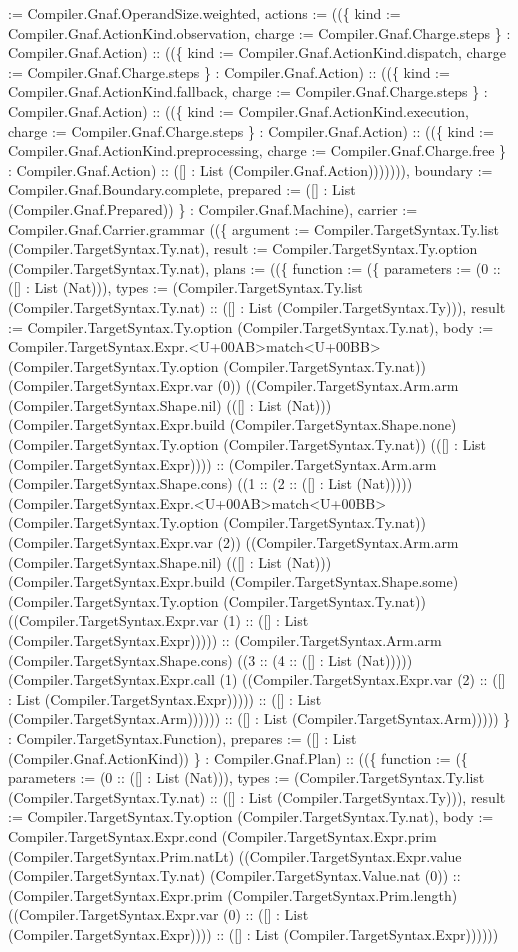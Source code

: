 \documentclass[11pt]{article}
\begin{document}
:= Compiler.Gnaf.OperandSize.weighted, actions := ((\{ kind := Compiler.Gnaf.ActionKind.observation, charge := Compiler.Gnaf.Charge.steps \} : Compiler.Gnaf.Action) :: ((\{ kind := Compiler.Gnaf.ActionKind.dispatch, charge := Compiler.Gnaf.Charge.steps \} : Compiler.Gnaf.Action) :: ((\{ kind := Compiler.Gnaf.ActionKind.fallback, charge := Compiler.Gnaf.Charge.steps \} : Compiler.Gnaf.Action) :: ((\{ kind := Compiler.Gnaf.ActionKind.execution, charge := Compiler.Gnaf.Charge.steps \} : Compiler.Gnaf.Action) :: ((\{ kind := Compiler.Gnaf.ActionKind.preprocessing, charge := Compiler.Gnaf.Charge.free \} : Compiler.Gnaf.Action) :: ([] : List (Compiler.Gnaf.Action))))))), boundary := Compiler.Gnaf.Boundary.complete, prepared := ([] : List (Compiler.Gnaf.Prepared)) \} : Compiler.Gnaf.Machine), carrier := Compiler.Gnaf.Carrier.grammar ((\{ argument := Compiler.TargetSyntax.Ty.list (Compiler.TargetSyntax.Ty.nat), result := Compiler.TargetSyntax.Ty.option (Compiler.TargetSyntax.Ty.nat), plans := ((\{ function := (\{ parameters := (0 :: ([] : List (Nat))), types := (Compiler.TargetSyntax.Ty.list (Compiler.TargetSyntax.Ty.nat) :: ([] : List (Compiler.TargetSyntax.Ty))), result := Compiler.TargetSyntax.Ty.option (Compiler.TargetSyntax.Ty.nat), body := Compiler.TargetSyntax.Expr.<U+00AB>match<U+00BB> (Compiler.TargetSyntax.Ty.option (Compiler.TargetSyntax.Ty.nat)) (Compiler.TargetSyntax.Expr.var (0)) ((Compiler.TargetSyntax.Arm.arm (Compiler.TargetSyntax.Shape.nil) (([] : List (Nat))) (Compiler.TargetSyntax.Expr.build (Compiler.TargetSyntax.Shape.none) (Compiler.TargetSyntax.Ty.option (Compiler.TargetSyntax.Ty.nat)) (([] : List (Compiler.TargetSyntax.Expr)))) :: (Compiler.TargetSyntax.Arm.arm (Compiler.TargetSyntax.Shape.cons) ((1 :: (2 :: ([] : List (Nat))))) (Compiler.TargetSyntax.Expr.<U+00AB>match<U+00BB> (Compiler.TargetSyntax.Ty.option (Compiler.TargetSyntax.Ty.nat)) (Compiler.TargetSyntax.Expr.var (2)) ((Compiler.TargetSyntax.Arm.arm (Compiler.TargetSyntax.Shape.nil) (([] : List (Nat))) (Compiler.TargetSyntax.Expr.build (Compiler.TargetSyntax.Shape.some) (Compiler.TargetSyntax.Ty.option (Compiler.TargetSyntax.Ty.nat)) ((Compiler.TargetSyntax.Expr.var (1) :: ([] : List (Compiler.TargetSyntax.Expr))))) :: (Compiler.TargetSyntax.Arm.arm (Compiler.TargetSyntax.Shape.cons) ((3 :: (4 :: ([] : List (Nat))))) (Compiler.TargetSyntax.Expr.call (1) ((Compiler.TargetSyntax.Expr.var (2) :: ([] : List (Compiler.TargetSyntax.Expr))))) :: ([] : List (Compiler.TargetSyntax.Arm)))))) :: ([] : List (Compiler.TargetSyntax.Arm))))) \} : Compiler.TargetSyntax.Function), prepares := ([] : List (Compiler.Gnaf.ActionKind)) \} : Compiler.Gnaf.Plan) :: ((\{ function := (\{ parameters := (0 :: ([] : List (Nat))), types := (Compiler.TargetSyntax.Ty.list (Compiler.TargetSyntax.Ty.nat) :: ([] : List (Compiler.TargetSyntax.Ty))), result := Compiler.TargetSyntax.Ty.option (Compiler.TargetSyntax.Ty.nat), body := Compiler.TargetSyntax.Expr.cond (Compiler.TargetSyntax.Expr.prim (Compiler.TargetSyntax.Prim.natLt) ((Compiler.TargetSyntax.Expr.value (Compiler.TargetSyntax.Ty.nat) (Compiler.TargetSyntax.Value.nat (0)) :: (Compiler.TargetSyntax.Expr.prim (Compiler.TargetSyntax.Prim.length) ((Compiler.TargetSyntax.Expr.var (0) :: ([] : List (Compiler.TargetSyntax.Expr)))) :: ([] : List (Compiler.TargetSyntax.Expr)))))) 
\end{document}
